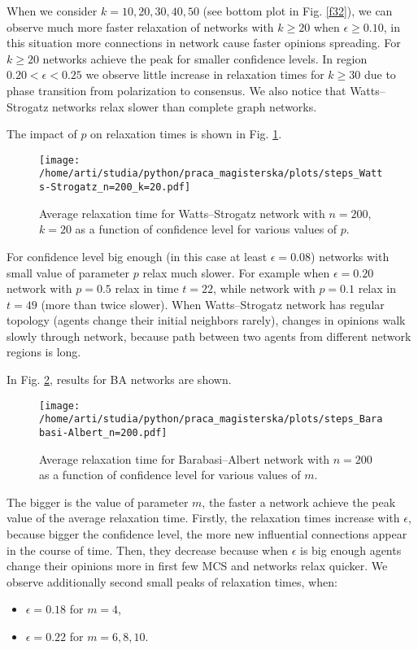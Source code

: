\documentclass[a4paper, 12pt]{article}
\begin{document}
When we consider $k=10, 20, 30, 40, 50$ (see bottom plot in Fig. \ref{f32}), we can observe much more faster relaxation of networks with $k \geq 20$ when $\epsilon \geq 0.10$, in this situation more connections in network cause faster opinions spreading. For $k \geq 20$ networks achieve the peak for smaller confidence levels. In region $0.20 < \epsilon < 0.25$ we observe little increase in relaxation times for $k \geq 30$ due to phase transition from polarization to consensus. We also notice that Watts--Strogatz networks relax slower than complete graph networks.

\indent

The impact of $p$ on relaxation times is shown in Fig. \ref{f33}.

\begin{figure}[H]
		\centering
		\texttt{[image: /home/arti/studia/python/praca\_magisterska/plots/steps\_Watts-Strogatz\_n=200\_k=20.pdf]}
		\caption{Average relaxation time for Watts--Strogatz network with $n=200$, $k=20$ as a function of confidence level for various values of $p$.}
		\label{f33}
\end{figure}

For confidence level big enough (in this case at least $\epsilon=0.08$) networks with small value of parameter $p$ relax much slower. For example when $\epsilon=0.20$ network with $p=0.5$ relax in time $t=22$, while network with $p=0.1$ relax in $t=49$ (more than twice slower). When Watts--Strogatz network has regular topology (agents change their initial neighbors rarely), changes in opinions walk slowly through network, because path between two agents from different network regions is long.

\indent

In Fig. \ref{f34}, results for BA networks are shown.

\begin{figure}[H]
		\centering
		\texttt{[image: /home/arti/studia/python/praca\_magisterska/plots/steps\_Barabasi-Albert\_n=200.pdf]}
		\caption{Average relaxation time for Barabasi--Albert network with $n=200$ as a function of confidence level for various values of $m$.}
		\label{f34}
\end{figure}

The bigger is the value of parameter $m$, the faster a network achieve the peak value of the average relaxation time. Firstly, the relaxation times increase with $\epsilon$, because bigger the confidence level, the more new influential connections appear in the course of time. Then, they decrease because when $\epsilon$ is big enough agents   change their opinions more in first few MCS and networks relax quicker. We observe additionally second small peaks of relaxation times, when:
\begin{itemize}
\item $\epsilon=0.18$ for $m=4$,
\item $\epsilon=0.22$ for $m=6,8,10$.
\end{itemize}
\end{document}

